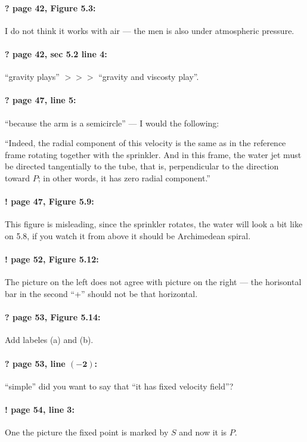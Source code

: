 \documentclass[twoside]{article}
\begin{document}
\paragraph{? page 42, Figure 5.3:} I do not think it works with air --- the men is also under atmospheric pressure.

\paragraph{? page 42, sec 5.2 line 4:} ``gravity plays'' $>\!>\!>$ ``gravity and viscosty play''.

\paragraph{? page 47, line 5:} ``because the arm is a semicircle'' --- I would the following:

``Indeed, the radial component of this velocity is the same as in the reference frame rotating together with the sprinkler.
And in this frame, the water jet must be directed tangentially to the tube, that is, perpendicular to the direction toward $P$; in other words, it has zero radial component.''

\paragraph{! page 47, Figure 5.9:} This figure is misleading, since the sprinkler rotates, the water will look a bit like on 5.8, if you watch it from above it should be Archimedean spiral.

\paragraph{! page 52, Figure 5.12:} The picture on the left does not agree with picture on the right --- the horisontal bar in the second ``+'' should not be that horizontal.

\paragraph{? page 53, Figure 5.14:} Add labeles (a) and (b).

\paragraph{? page 53, line $\bm{(-2)}$:} ``simple'' did you want to say that ``it has fixed velocity field''?

\paragraph{! page 54, line 3:} One the picture the fixed point is marked by $S$ and now it is $P$.
\end{document}

